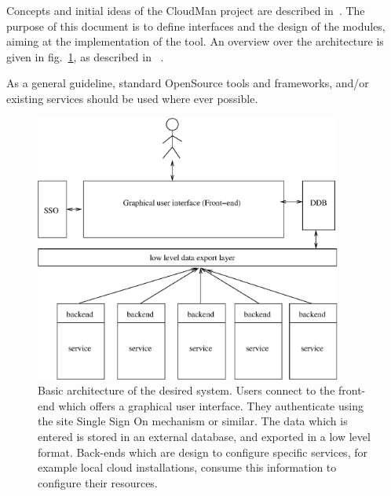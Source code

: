 Concepts and initial ideas of the CloudMan project are described in~\cite{CloudManProject}. The purpose of this document is to define interfaces and the design of the modules, aiming at the implementation of the tool. An overview over the architecture is given in fig.~\ref{architecture}, as described in ~\cite{CloudManProject}.

As a general guideline, standard OpenSource tools and frameworks, and/or existing services should be used where ever possible. 

\begin{figure}
\begin{center}
\includegraphics[width=0.9\textwidth]{architecture2.eps}
\caption{\label{architecture} Basic architecture of the desired system. Users connect to the front-end which offers a graphical user interface. They authenticate using the site Single Sign On mechanism or similar. The data which is entered is stored in an external database, and exported in a low level format. Back-ends which are design to configure specific services, for example local cloud installations, consume this information to configure their resources.}
\end{center}
\end{figure}

